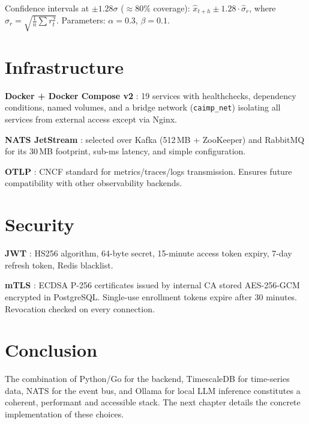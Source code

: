 Confidence intervals at $\pm 1.28\sigma$ ($\approx$80\% coverage):
$\hat{x}_{t+h} \pm 1.28 \cdot \hat{\sigma}_r$, where
$\hat{\sigma}_r = \sqrt{\frac{1}{n}\sum r_t^2}$.
Parameters: $\alpha = 0.3$, $\beta = 0.1$.

\section{Infrastructure}

\textbf{Docker + Docker Compose v2} \cite{docker_docs}: 19 services with
healthchecks, dependency conditions, named volumes, and a bridge network
(\texttt{caimp\_net}) isolating all services from external access except via Nginx.

\textbf{NATS JetStream} \cite{nats_docs}: selected over Kafka (512\,MB + ZooKeeper)
and RabbitMQ for its 30\,MB footprint, sub-ms latency, and simple configuration.

\textbf{OTLP} \cite{otlp_spec}: CNCF standard for metrics/traces/logs transmission.
Ensures future compatibility with other observability backends.

\section{Security}

\textbf{JWT} \cite{rfc7519}: HS256 algorithm, 64-byte secret, 15-minute access
token expiry, 7-day refresh token, Redis blacklist.

\textbf{mTLS} \cite{rfc8446}: ECDSA P-256 certificates issued by internal CA
stored AES-256-GCM encrypted in PostgreSQL. Single-use enrollment tokens expire
after 30 minutes. Revocation checked on every connection.

\section*{Conclusion}

The combination of Python/Go for the backend, TimescaleDB for time-series data,
NATS for the event bus, and Ollama for local LLM inference constitutes a coherent,
performant and accessible stack. The next chapter details the concrete
implementation of these choices.
